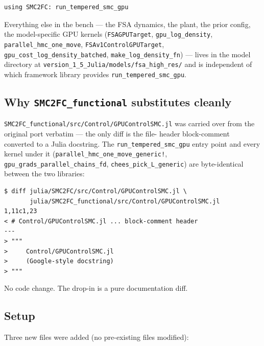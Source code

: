 \documentclass[11pt,a4paper]{article}
\begin{document}
\begin{lstlisting}
using SMC2FC: run_tempered_smc_gpu
\end{lstlisting}

\noindent Everything else in the bench --- the FSA dynamics, the plant,
the prior config, the model-specific GPU kernels (\texttt{FSAGPUTarget},
\texttt{gpu\_log\_density}, \texttt{parallel\_hmc\_one\_move},
\texttt{FSAv1ControlGPUTarget}, \texttt{gpu\_cost\_log\_density\_batched},
\texttt{make\_log\_density\_fn}) --- lives in the model directory at
\texttt{version\_1\_5\_Julia/models/fsa\_high\_res/} and is independent
of which framework library provides \texttt{run\_tempered\_smc\_gpu}.

\subsection{Why \texttt{SMC2FC\_functional} substitutes cleanly}

\texttt{SMC2FC\_functional/src/Control/GPUControlSMC.jl} was carried
over from the original port verbatim --- the only diff is the file-
header block-comment converted to a Julia docstring. The
\texttt{run\_tempered\_smc\_gpu} entry point and every kernel under it
(\texttt{parallel\_hmc\_one\_move\_generic!},
\texttt{gpu\_grads\_parallel\_chains\_fd},
\texttt{chees\_pick\_L\_generic}) are byte-identical between the two
libraries:

\begin{verbatim}
$ diff julia/SMC2FC/src/Control/GPUControlSMC.jl \
       julia/SMC2FC_functional/src/Control/GPUControlSMC.jl
1,11c1,23
< # Control/GPUControlSMC.jl ... block-comment header
---
> """
>     Control/GPUControlSMC.jl
>     (Google-style docstring)
> """
\end{verbatim}

\noindent No code change. The drop-in is a pure documentation diff.

\subsection{Setup}

Three new files were added (no pre-existing files modified):
\end{document}
